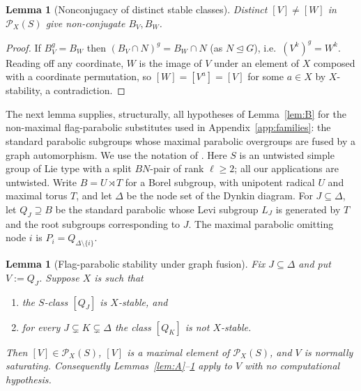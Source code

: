 \documentclass[11pt]{amsart}
\newtheorem{lemma}[theorem]{Lemma}
\theoremstyle{definition}
\theoremstyle{remark}
\newcommand{\Pos}{\mathcal{P}}
\begin{document}
\begin{lemma}[Nonconjugacy of distinct stable classes]\label{lem:C}
Distinct $[V]\neq[W]$ in $\Pos_X(S)$ give non-conjugate $B_V,B_W$.
\end{lemma}

\begin{proof}
If $B_V^g=B_W$ then $(B_V\cap N)^g=B_W\cap N$ (as $N\trianglelefteq G$),
i.e.\ $(V^k)^g=W^k$. Reading off any coordinate, $W$ is the image of $V$
under an element of $X$ composed with a coordinate permutation, so
$[W]=[V^a]=[V]$ for some $a\in X$ by $X$-stability, a contradiction.
\end{proof}

The next lemma supplies, structurally, all hypotheses of
Lemma~\ref{lem:B} for the non-maximal flag-parabolic substitutes used in
Appendix~\ref{app:families}: the standard parabolic subgroups whose maximal
parabolic overgroups are fused by a graph automorphism. We use the
notation of \cite{Carter}. Here $S$ is an untwisted simple group of Lie
type with a split $BN$-pair of rank $\ell\geq2$; all our applications
are untwisted. Write $B=U\rtimes T$ for a Borel subgroup, with unipotent
radical $U$ and maximal torus $T$, and let $\Delta$ be the node set of
the Dynkin diagram. For $J\subseteq\Delta$, let $Q_J\supseteq B$ be the
standard parabolic whose Levi subgroup $L_J$ is generated by $T$ and the
root subgroups corresponding to $J$. The maximal parabolic omitting node
$i$ is $P_i=Q_{\Delta\setminus\{i\}}$.

\begin{lemma}[Flag-parabolic stability under graph fusion]\label{lem:P}
Fix $J\subseteq\Delta$ and put $V:=Q_J$. Suppose $X$ is such that
\begin{enumerate}
\item[(a)] the $S$-class $[Q_J]$ is $X$-stable, and
\item[(b)] for every $J\subsetneq K\subsetneq\Delta$ the class $[Q_K]$
is \emph{not} $X$-stable.
\end{enumerate}
Then $[V]\in\Pos_X(S)$, $[V]$ is a maximal element of $\Pos_X(S)$, and
$V$ is normally saturating. Consequently Lemmas~\ref{lem:A}--\ref{lem:C}
apply to $V$ with no computational hypothesis.
\end{lemma}
\end{document}
